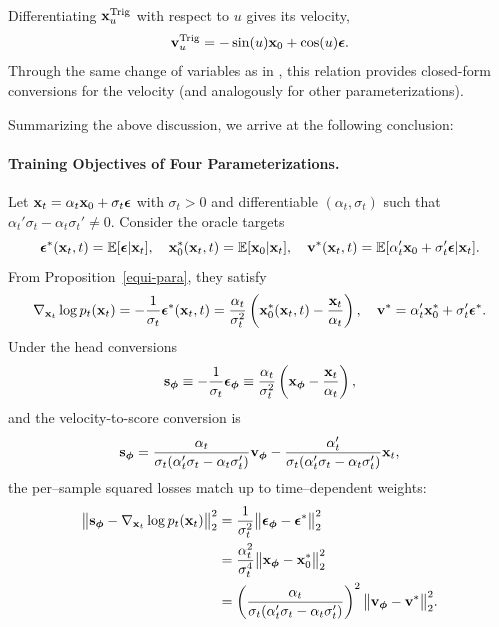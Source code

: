 Differentiating ${\mathbf{x}}^{\mathrm{Trig}}_u$ with respect to $u$ gives its velocity,  
\[
{\mathbf{v}}^{\mathrm{Trig}}_u = -\sin(u) {\mathbf{x}}_0 + \cos(u) {\bm{\epsilon}}.
\]
Through the same change of variables as in , this relation provides closed-form conversions for the velocity (and analogously for other parameterizations).


Summarizing the above discussion, we arrive at the following conclusion:



\paragraph{Training Objectives of Four Parameterizations.}
Let ${\mathbf{x}}_t=\alpha_t {\mathbf{x}}_0+\sigma_t {\bm{\epsilon}}$ with $\sigma_t>0$ and differentiable $(\alpha_t,\sigma_t)$ such that $\alpha_t'\sigma_t-\alpha_t\sigma_t'\neq 0$. Consider the oracle targets
\[
{\bm{\epsilon}}^*({\mathbf{x}}_t,t)=\mathbb{E}[{\bm{\epsilon}}|{\mathbf{x}}_t],\quad 
{\mathbf{x}}_0^*({\mathbf{x}}_t,t)=\mathbb{E}[{\mathbf{x}}_0|{\mathbf{x}}_t],\quad
{\mathbf{v}}^*({\mathbf{x}}_t,t)=\mathbb{E}[\alpha_t'{\mathbf{x}}_0+\sigma_t'{\bm{\epsilon}}|{\mathbf{x}}_t].
\]
From Proposition~\ref{equi-para}, they satisfy
\[
\nabla_{{\mathbf{x}}_t}\log p_t({\mathbf{x}}_t)
= -\frac{1}{\sigma_t} {\bm{\epsilon}}^*({\mathbf{x}}_t,t)
= \frac{\alpha_t}{\sigma_t^2} \left({\mathbf{x}}_0^*({\mathbf{x}}_t,t)-\frac{{\mathbf{x}}_t}{\alpha_t}\right),
\quad
{\mathbf{v}}^*=\alpha_t' {\mathbf{x}}_0^*+\sigma_t' {\bm{\epsilon}}^*.
\]
Under the head conversions
\[
{\mathbf{s}}_{{\bm{\phi}}} \equiv -\frac{1}{\sigma_t} {\bm{\epsilon}}_{{\bm{\phi}}}
\equiv \frac{\alpha_t}{\sigma_t^2} \left({\mathbf{x}}_{{\bm{\phi}}}-\frac{{\mathbf{x}}_t}{\alpha_t}\right),
\]
and the velocity-to-score conversion is
\[
{\mathbf{s}}_{{\bm{\phi}}}
= \frac{\alpha_t}{\sigma_t(\alpha_t'\sigma_t-\alpha_t\sigma_t')} {\mathbf{v}}_{{\bm{\phi}}}
- \frac{\alpha_t'}{\sigma_t(\alpha_t'\sigma_t-\alpha_t\sigma_t')} {\mathbf{x}}_t,
\]
the per–sample squared losses match up to time–dependent weights:
\begin{align}\label{eq:s-e-x-v-equi}
\begin{aligned}
\big\|{\mathbf{s}}_{{\bm{\phi}}}-\nabla_{{\mathbf{x}}_t}\log p_t({\mathbf{x}}_t)\big\|_2^2
&=\frac{1}{\sigma_t^2} \big\|{\bm{\epsilon}}_{{\bm{\phi}}}-{\bm{\epsilon}}^*\big\|_2^2 \\
&=\frac{\alpha_t^2}{\sigma_t^4} \big\|{\mathbf{x}}_{{\bm{\phi}}}-{\mathbf{x}}_0^*\big\|_2^2 \\
&=\left(\frac{\alpha_t}{\sigma_t(\alpha_t'\sigma_t-\alpha_t\sigma_t')}\right)^{ 2}
\big\|{\mathbf{v}}_{{\bm{\phi}}}-{\mathbf{v}}^*\big\|_2^2 .
\end{aligned}
\end{align}

